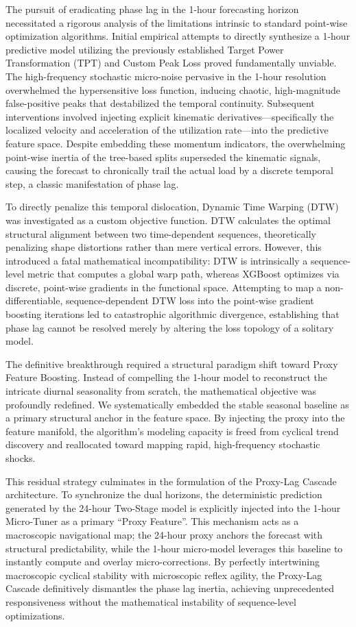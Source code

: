 \documentclass[pdflatex,sn-mathphys-num]{sn-jnl}%
\theoremstyle{thmstyleone}%
\theoremstyle{thmstyletwo}%
\theoremstyle{thmstylethree}%
\begin{document}
The pursuit of eradicating phase lag in the 1-hour forecasting horizon necessitated a rigorous analysis of the limitations intrinsic to standard point-wise optimization algorithms. Initial empirical attempts to directly synthesize a 1-hour predictive model utilizing the previously established Target Power Transformation (TPT) and Custom Peak Loss proved fundamentally unviable. The high-frequency stochastic micro-noise pervasive in the 1-hour resolution overwhelmed the hypersensitive loss function, inducing chaotic, high-magnitude false-positive peaks that destabilized the temporal continuity. Subsequent interventions involved injecting explicit kinematic derivatives---specifically the localized velocity and acceleration of the utilization rate---into the predictive feature space. Despite embedding these momentum indicators, the overwhelming point-wise inertia of the tree-based splits superseded the kinematic signals, causing the forecast to chronically trail the actual load by a discrete temporal step, a classic manifestation of phase lag.

To directly penalize this temporal dislocation, Dynamic Time Warping (DTW) was investigated as a custom objective function. DTW calculates the optimal structural alignment between two time-dependent sequences, theoretically penalizing shape distortions rather than mere vertical errors. However, this introduced a fatal mathematical incompatibility: DTW is intrinsically a sequence-level metric that computes a global warp path, whereas XGBoost optimizes via discrete, point-wise gradients in the functional space. Attempting to map a non-differentiable, sequence-dependent DTW loss into the point-wise gradient boosting iterations led to catastrophic algorithmic divergence, establishing that phase lag cannot be resolved merely by altering the loss topology of a solitary model.

The definitive breakthrough required a structural paradigm shift toward Proxy Feature Boosting. Instead of compelling the 1-hour model to reconstruct the intricate diurnal seasonality from scratch, the mathematical objective was profoundly redefined. We systematically embedded the stable seasonal baseline as a primary structural anchor in the feature space. By injecting the proxy into the feature manifold, the algorithm's modeling capacity is freed from cyclical trend discovery and reallocated toward mapping rapid, high-frequency stochastic shocks.

This residual strategy culminates in the formulation of the Proxy-Lag Cascade architecture. To synchronize the dual horizons, the deterministic prediction generated by the 24-hour Two-Stage model is explicitly injected into the 1-hour Micro-Tuner as a primary ``Proxy Feature''. This mechanism acts as a macroscopic navigational map; the 24-hour proxy anchors the forecast with structural predictability, while the 1-hour micro-model leverages this baseline to instantly compute and overlay micro-corrections. By perfectly intertwining macroscopic cyclical stability with microscopic reflex agility, the Proxy-Lag Cascade definitively dismantles the phase lag inertia, achieving unprecedented responsiveness without the mathematical instability of sequence-level optimizations.
\end{document}
